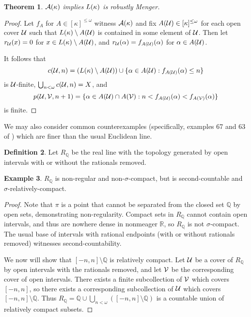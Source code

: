 \documentclass{amsart}
\newtheorem{theorem}{Theorem}[section]
\theoremstyle{definition}
\newtheorem{definition}[theorem]{Definition}
\newtheorem{example}[theorem]{Example}
\begin{document}
\begin{theorem}
  \(\mathcal{A}(\kappa)\) implies \(L(\kappa)\) is
  robustly Menger.
\end{theorem}

\begin{proof}
  Let \(f_A\) for \(A\in[\kappa]^{\leq\omega}\) witness \(\mathcal{A}(\kappa)\) and fix
  \(A(\mathcal{U})\in[\kappa]^{\leq\omega}\) for each open cover \(\mathcal{U}\) such that
  \(L(\kappa)\setminus A(\mathcal{U})\) is contained in some element of
  \(\mathcal{U}\).
  Then let \(r_{\mathcal{U}}(x)=0\) for \(x\in L(\kappa)\setminus A(\mathcal{U})\),
  and \(r_{\mathcal{U}}(\alpha)=f_{A(\mathcal{U})}(\alpha)\) for \(\alpha\in A(\mathcal{U})\).

  It follows that
    \[
      c(\mathcal{U},n)
        =
      \left(L(\kappa)\setminus A(\mathcal{U})\right)
        \cup
      \{\alpha\in A(\mathcal{U}) : f_{A(\mathcal{U})}(\alpha)\leq n \}
    \]
  is \(\mathcal{U}\)-finite, \(\bigcup_{n<\omega}c(\mathcal{U},n)=X\), and
    \[
      p(\mathcal{U},\mathcal{V},n+1)
        =
      \{
        \alpha\in A(\mathcal{U})\cap A(\mathcal{V})
          :
        n < f_{A(\mathcal{U})}(\alpha) < f_{A(\mathcal{V})}(\alpha)
      \}
    \]
  is finite.
\end{proof}

We may also consider common counterexamples (specifically, examples
67 and 63 of \cite{MR1382863}) which are finer
than the usual Euclidean line.

\begin{definition}
  Let \(R_{\mathbb Q}\) be the real line with the topology generated by open
  intervals with or without the rationals removed.
\end{definition}

\begin{example}
  \(R_{\mathbb Q}\) is non-regular and non-\(\sigma\)-compact, but is
  second-countable and \(\sigma\)-relatively-compact.
\end{example}

\begin{proof}
  Note that \(\pi\) is a point that cannot be separated from the closed
  set \(\mathbb Q\) by open sets, demonstrating non-regularity.
  Compact sets in \(R_{\mathbb Q}\) cannot contain open intervals,
  and thus are nowhere dense in nonmeager \(\mathbb R\),
  so \(R_{\mathbb Q}\) is not \(\sigma\)-compact. The usual base of
  intervals with rational endpoints (with or without rationals removed)
  witnesses second-countability.

  We now will show that \([-n,n]\setminus\mathbb Q\) is relatively compact.
  Let \(\mathcal{U}\) be a cover of
  \(R_{\mathbb Q}\) by open intervals with the rationals removed,
  and let \(\mathcal{V}\) be the corresponding cover of open intervals.
  There exists a finite subcollection of \(\mathcal{V}\) which covers
  \([-n,n]\), so there exists a corresponding subcollection of
  \(\mathcal{U}\) which covers \([-n,n]\setminus\mathbb Q\).
  Thus
  \(R_{\mathbb Q}=\mathbb Q\cup\bigcup_{n<\omega}([-n,n]\setminus\mathbb Q)\)
  is a countable union of relatively compact subsets.
\end{proof}
\end{document}
